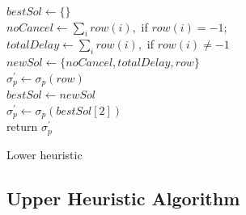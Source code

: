\begin{algorithm}[]
	\DontPrintSemicolon
	
	$bestSol \gets \{\}$\\
	{
		$noCancel \gets \sum_{i} row(i),$ if $row(i) = -1$;\\
		$totalDelay \gets \sum_{i} row(i),$ if $row(i) \ne -1$	\\
		$newSol \gets \{noCancel, totalDelay, row\} $\\
		$\sigma^\prime_p \gets \sigma_p(row)$\\
		$bestSol \gets newSol$\\
		
	}
	$\sigma^\prime_p \gets \sigma_p(bestSol[2]) $\\
	return $\sigma^\prime_p$
	\caption{Lower heuristic}
	\label{algo:lowerHeuristic}
\end{algorithm}


\subsection{Upper Heuristic Algorithm} \label{sec:upperHeuristic}

